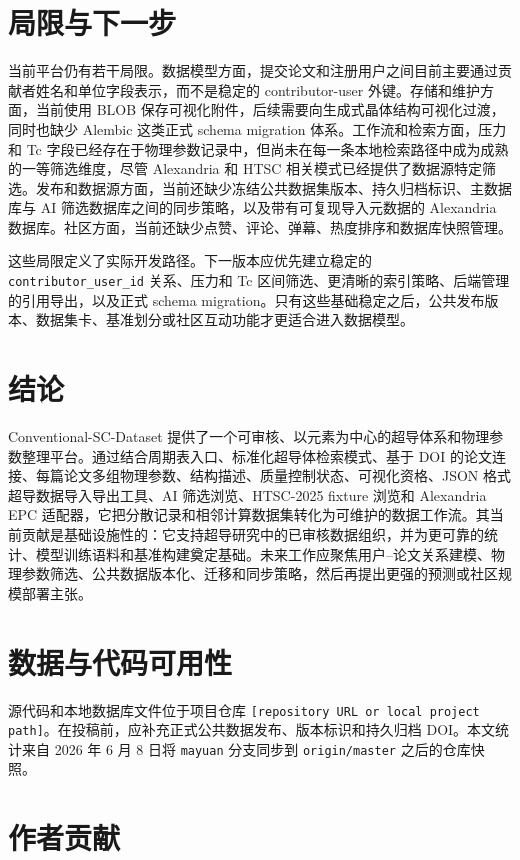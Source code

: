 \documentclass[11pt,a4paper]{ctexart}
\begin{document}
\section{局限与下一步}

当前平台仍有若干局限。数据模型方面，提交论文和注册用户之间目前主要通过贡献者姓名和单位字段表示，而不是稳定的 contributor-user 外键。存储和维护方面，当前使用 BLOB 保存可视化附件，后续需要向生成式晶体结构可视化过渡，同时也缺少 Alembic 这类正式 schema migration 体系。工作流和检索方面，压力和 Tc 字段已经存在于物理参数记录中，但尚未在每一条本地检索路径中成为成熟的一等筛选维度，尽管 Alexandria 和 HTSC 相关模式已经提供了数据源特定筛选。发布和数据源方面，当前还缺少冻结公共数据集版本、持久归档标识、主数据库与 AI 筛选数据库之间的同步策略，以及带有可复现导入元数据的 Alexandria 数据库。社区方面，当前还缺少点赞、评论、弹幕、热度排序和数据库快照管理。

这些局限定义了实际开发路径。下一版本应优先建立稳定的 \texttt{contributor\_user\_id} 关系、压力和 Tc 区间筛选、更清晰的索引策略、后端管理的引用导出，以及正式 schema migration。只有这些基础稳定之后，公共发布版本、数据集卡、基准划分或社区互动功能才更适合进入数据模型。

\section{结论}

Conventional-SC-Dataset 提供了一个可审核、以元素为中心的超导体系和物理参数整理平台。通过结合周期表入口、标准化超导体检索模式、基于 DOI 的论文连接、每篇论文多组物理参数、结构描述、质量控制状态、可视化资格、JSON 格式超导数据导入导出工具、AI 筛选浏览、HTSC-2025 fixture 浏览和 Alexandria EPC 适配器，它把分散记录和相邻计算数据集转化为可维护的数据工作流。其当前贡献是基础设施性的：它支持超导研究中的已审核数据组织，并为更可靠的统计、模型训练语料和基准构建奠定基础。未来工作应聚焦用户--论文关系建模、物理参数筛选、公共数据版本化、迁移和同步策略，然后再提出更强的预测或社区规模部署主张。

\section*{数据与代码可用性}

源代码和本地数据库文件位于项目仓库 \texttt{[repository URL or local project path]}。在投稿前，应补充正式公共数据发布、版本标识和持久归档 DOI。本文统计来自 2026 年 6 月 8 日将 \texttt{mayuan} 分支同步到 \texttt{origin/master} 之后的仓库快照。

\section*{作者贡献}
\end{document}

